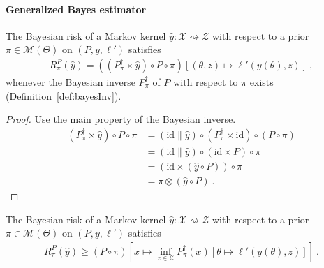 \paragraph{Generalized Bayes estimator}

\begin{lemma}
  \label{lem:bayesianRisk_bayesInv}
  \mathlibok
  The Bayesian risk of a Markov kernel $\hat{y} : \mathcal X \rightsquigarrow \mathcal Z$ with respect to a prior $\pi \in \mathcal M(\Theta)$ on $(P, y, \ell')$ satisfies
  \begin{align*}
  R^P_\pi(\hat{y}) = ((P_\pi^\dagger \times \hat{y}) \circ P \circ \pi)\left[(\theta, z) \mapsto \ell'(y(\theta), z)\right] \: ,
  \end{align*}
  whenever the Bayesian inverse $P_\pi^\dagger$ of $P$ with respect to $\pi$ exists (Definition~\ref{def:bayesInv}).
\end{lemma}

\begin{proof}\mathlibok
{}
Use the main property of the Bayesian inverse.
\begin{align*}
  (P_\pi^\dagger \times \hat{y}) \circ P \circ \pi
  &= (\mathrm{id} \parallel \hat{y}) \circ (P_\pi^\dagger \times \mathrm{id}) \circ (P \circ \pi)
  \\
  &= (\mathrm{id} \parallel \hat{y}) \circ (\mathrm{id} \times P) \circ \pi
  \\
  &= (\mathrm{id} \times (\hat{y} \circ P)) \circ \pi
  \\
  &= \pi \otimes (\hat{y} \circ P)
  \: .
  \end{align*}
\end{proof}

\begin{lemma}
  \label{lem:bayesianRisk_ge_inf_bayesInv}
  \mathlibok
  The Bayesian risk of a Markov kernel $\hat{y} : \mathcal X \rightsquigarrow \mathcal Z$ with respect to a prior $\pi \in \mathcal M(\Theta)$ on $(P, y, \ell')$ satisfies
  \begin{align*}
  R^P_\pi(\hat{y}) \ge (P \circ \pi)\left[x \mapsto \inf_{z \in \mathcal Z} P_\pi^\dagger(x) \left[\theta \mapsto \ell'(y(\theta), z)\right]\right] \: .
  \end{align*}
\end{lemma}

